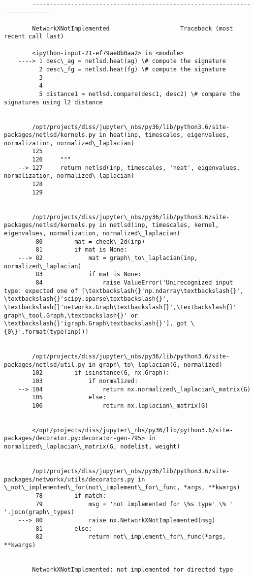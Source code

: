 \documentclass[11pt]{article}
\begin{document}
    \begin{Verbatim}[commandchars=\\\{\}]

        ---------------------------------------------------------------------------

        NetworkXNotImplemented                    Traceback (most recent call last)

        <ipython-input-21-ef79ae8b0aa2> in <module>
    ----> 1 desc\_ag = netlsd.heat(ag) \# compute the signature
          2 desc\_fg = netlsd.heat(fg) \# compute the signature
          3 
          4 
          5 distance1 = netlsd.compare(desc1, desc2) \# compare the signatures using l2 distance


        /opt/projects/diss/jupyter\_nbs/py36/lib/python3.6/site-packages/netlsd/kernels.py in heat(inp, timescales, eigenvalues, normalization, normalized\_laplacian)
        125 
        126     """
    --> 127     return netlsd(inp, timescales, 'heat', eigenvalues, normalization, normalized\_laplacian)
        128 
        129 


        /opt/projects/diss/jupyter\_nbs/py36/lib/python3.6/site-packages/netlsd/kernels.py in netlsd(inp, timescales, kernel, eigenvalues, normalization, normalized\_laplacian)
         80         mat = check\_2d(inp)
         81         if mat is None:
    ---> 82             mat = graph\_to\_laplacian(inp, normalized\_laplacian)
         83             if mat is None:
         84                 raise ValueError('Unirecognized input type: expected one of [\textbackslash{}'np.ndarray\textbackslash{}', \textbackslash{}'scipy.sparse\textbackslash{}', \textbackslash{}'networkx.Graph\textbackslash{}',\textbackslash{}' graph\_tool.Graph,\textbackslash{}' or \textbackslash{}'igraph.Graph\textbackslash{}'], got \{0\}'.format(type(inp)))


        /opt/projects/diss/jupyter\_nbs/py36/lib/python3.6/site-packages/netlsd/util.py in graph\_to\_laplacian(G, normalized)
        102         if isinstance(G, nx.Graph):
        103             if normalized:
    --> 104                 return nx.normalized\_laplacian\_matrix(G)
        105             else:
        106                 return nx.laplacian\_matrix(G)


        </opt/projects/diss/jupyter\_nbs/py36/lib/python3.6/site-packages/decorator.py:decorator-gen-795> in normalized\_laplacian\_matrix(G, nodelist, weight)


        /opt/projects/diss/jupyter\_nbs/py36/lib/python3.6/site-packages/networkx/utils/decorators.py in \_not\_implemented\_for(not\_implement\_for\_func, *args, **kwargs)
         78         if match:
         79             msg = 'not implemented for \%s type' \% ' '.join(graph\_types)
    ---> 80             raise nx.NetworkXNotImplemented(msg)
         81         else:
         82             return not\_implement\_for\_func(*args, **kwargs)


        NetworkXNotImplemented: not implemented for directed type

    \end{Verbatim}
\end{document}
